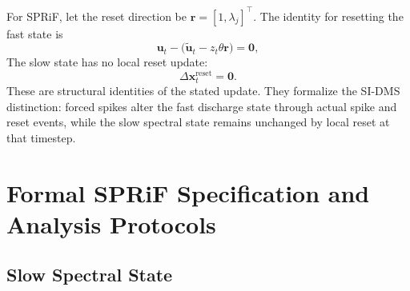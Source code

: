 \documentclass[letterpaper]{article}
\begin{document}
For SPRiF, let the reset direction be $\mathbf{r}=[1,\lambda_j]^\top$. The identity for resetting the fast state is
\begin{equation}
\mathbf{u}_t-\bigl(\widetilde{\mathbf{u}}_t-z_t\theta\mathbf{r}\bigr)=\mathbf{0},
\label{eq:supp_reset_residual}
\end{equation}
The slow state has no local reset update:
\begin{equation}
\Delta\mathbf{x}_t^{\mathrm{reset}}=\mathbf{0}.
\label{eq:supp_slow_insulation}
\end{equation}
These are structural identities of the stated update. They formalize the SI-DMS distinction: forced spikes alter the fast discharge state through actual spike and reset events, while the slow spectral state remains unchanged by local reset at that timestep.

\section{Formal SPRiF Specification and Analysis Protocols}
\label{supp:sec:dynamics}

\subsection{Slow Spectral State}
\label{supp:sec:slow-state}
\end{document}
